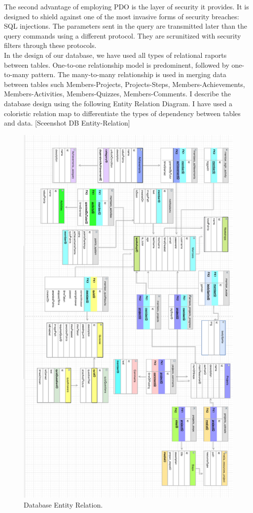 The second advantage of employing PDO is the layer of security it provides. It is designed to shield against one of the most invasive forms of security breaches: SQL injections. The parameters sent in the query are transmitted later than the query commands using a different protocol. They are scrunitized with security filters through these protocols.\\ 

In the design of our database, we have used all types of relational raports between tables. One-to-one relationship model is predominent, followed by one-to-many pattern. 
The many-to-many relationship is used in merging data between tables such Members-Projects, Projects-Steps, Members-Achievements, Members-Activities, Members-Quizzes, Members-Comments.
I describe the database design using the following Entity Relation Diagram. I have used a coloristic relation map to differentiate the types of dependency between tables and data.
[Sceenshot DB Entity-Relation]\\

\begin{figure}
\includegraphics[width=0.8\linewidth]{images/DBEntityRelation.png}
\caption{Database Entity Relation.}
\label{fig:boat1}
\end{figure}


